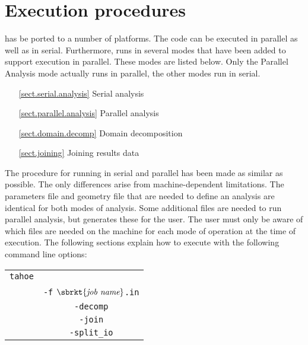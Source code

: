 
\section{Execution procedures}
\tahoe has be ported to a number of platforms.  The code can be executed in
parallel as well as in serial.  Furthermore, \tahoe runs in several modes
that have been added to support execution in parallel.  These modes are
listed below.  Only the Parallel Analysis mode actually runs in parallel,
the other modes run in serial.
\begin{itemize}
\item[\ref{sect.serial.analysis}] Serial analysis
\item[\ref{sect.parallel.analysis}] Parallel analysis
\item[\ref{sect.domain.decomp}] Domain decomposition
\item[\ref{sect.joining}] Joining results data
\end{itemize}
The procedure for running in serial and parallel has been made as similar
as possible.  The only differences arise from machine-dependent
limitations.  The parameters file and geometry file that are needed to
define an analysis are identical for both modes of analysis.  Some
additional files are needed to run parallel analysis, but \tahoe generates
these for the user.  The user must only be aware of which files are needed
on the machine for each mode of operation at the time of execution.  The
following sections explain how to execute \tahoe with the following command
line options:
\begin{center}
\begin{tabular}[c]{c c}
\parbox[b]{2.0in}{\raggedleft \texttt{tahoe}} &\parbox[b]{2.0in}{}\\
&\parbox[b]{2.0in}{\texttt{-f} $\sbrkt{\textit{job name}}$\texttt{.in}}\\
&\parbox[b]{2.0in}{\texttt{-decomp}}\\
&\parbox[b]{2.0in}{\texttt{-join}}\\
&\parbox[b]{2.0in}{\texttt{-split\_io}}\\
\end{tabular}
\end{center}

